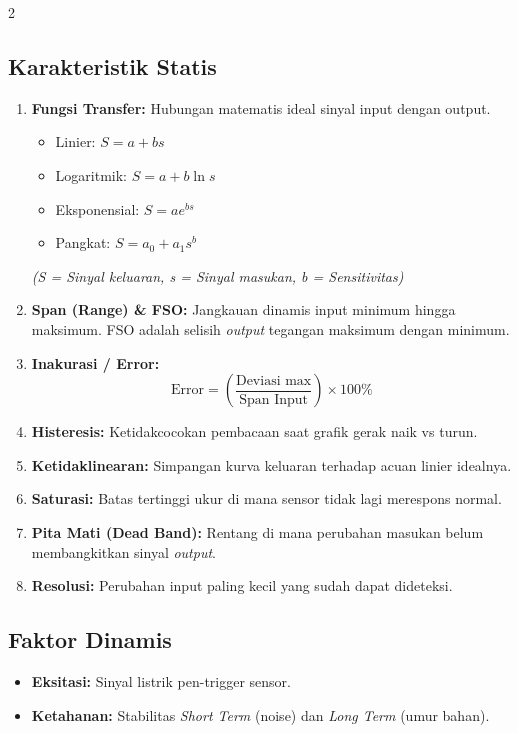 \documentclass[10pt]{article}
\begin{document}
\begin{multicols}{2}
\subsection*{Karakteristik Statis}
\begin{enumerate}
    \item \textbf{Fungsi Transfer:} Hubungan matematis ideal sinyal input dengan output.
    \begin{itemize}
        \item Linier: $S = a + bs$
        \item Logaritmik: $S = a + b \ln s$
        \item Eksponensial: $S = a e^{bs}$
        \item Pangkat: $S = a_0 + a_1 s^b$
    \end{itemize}
    \textit{(S = Sinyal keluaran, s = Sinyal masukan, b = Sensitivitas)}
    \item \textbf{Span (Range) \& FSO:} Jangkauan dinamis input minimum hingga maksimum. FSO adalah selisih \textit{output} tegangan maksimum dengan minimum.
    \item \textbf{Inakurasi / Error:} 
    \[ \text{Error} = \left(\frac{\text{Deviasi max}}{\text{Span Input}}\right) \times 100\% \]
    \item \textbf{Histeresis:} Ketidakcocokan pembacaan saat grafik gerak naik vs turun.
    \item \textbf{Ketidaklinearan:} Simpangan kurva keluaran terhadap acuan linier idealnya.
    \item \textbf{Saturasi:} Batas tertinggi ukur di mana sensor tidak lagi merespons normal.
    \item \textbf{Pita Mati (Dead Band):} Rentang di mana perubahan masukan belum membangkitkan sinyal \textit{output}.
    \item \textbf{Resolusi:} Perubahan input paling kecil yang sudah dapat dideteksi.
\end{enumerate}

\subsection*{Faktor Dinamis}
\begin{itemize}
    \item \textbf{Eksitasi:} Sinyal listrik pen-trigger sensor.
    \item \textbf{Ketahanan:} Stabilitas \textit{Short Term} (noise) dan \textit{Long Term} (umur bahan).
\end{itemize}


\end{multicols}
\end{document}
